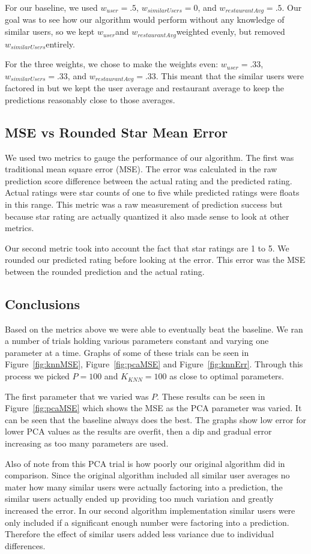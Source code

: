 \documentclass[10pt,twocolumn,letterpaper]{article}
\newcommand{\wu}{\ensuremath{w_{user}}}
\newcommand{\ws}{\ensuremath{w_{similarUsers}}}
\newcommand{\wrst}{\ensuremath{w_{restaurantAvg}}}
\begin{document}
For our baseline, we used $\wu=.5$, $\ws=0$, and $\wrst=.5$. Our goal was to see how our algorithm would perform without any knowledge of similar users, so we kept \wu and \wrst weighted evenly, but removed \ws entirely.

For the three weights, we chose to make the weights even: $\wu=.33$, $\ws=.33$, and $\wrst=.33$. This meant that the similar users were factored in but we kept the user average and restaurant average to keep the predictions reasonably close to those averages.

\subsection{MSE vs Rounded Star Mean Error}
We used two metrics to gauge the performance of our algorithm. The first was traditional mean square error (MSE). The error was calculated in the raw prediction score difference between the actual rating and the predicted rating. Actual ratings were star counts of one to five while predicted ratings were floats in this range. This metric was a raw measurement of prediction success but because star rating are actually quantized it also made sense to look at other metrics.

Our second metric took into account the fact that star ratings are 1 to 5. We rounded our predicted rating before looking at the error. This error was the MSE between the rounded prediction and the actual rating.

\subsection{Conclusions}
Based on the metrics above we were able to eventually beat the baseline. We ran a number of trials holding various parameters constant and varying one parameter at a time. Graphs of some of these trials can be seen in Figure~\ref{fig:knnMSE}, Figure~\ref{fig:pcaMSE} and Figure~\ref{fig:knnErr}. Through this process we picked $P=100$ and $K_{KNN}=100$ as close to optimal parameters.

The first parameter that we varied was $P$. These results can be seen in Figure~\ref{fig:pcaMSE} which shows the MSE as the PCA parameter was varied. It can be seen that the baseline always does the best. The graphs show low error for lower PCA values as the results are overfit, then a dip and gradual error increasing as too many parameters are used.

Also of note from this PCA trial is how poorly our original algorithm did in comparison. Since the original algorithm included all similar user averages no mater how many similar users were actually factoring into a prediction, the similar users actually ended up providing too much variation and greatly increased the error. In our second algorithm implementation similar users were only included if a significant enough number were factoring into a prediction. Therefore the effect of similar users added less variance due to individual differences.
\end{document}

